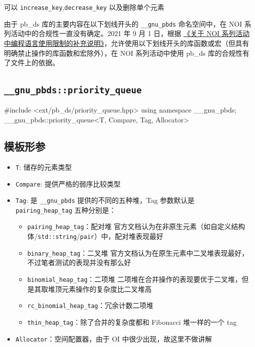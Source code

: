 可以 \texttt{increase\_key},\texttt{decrease\_key} 以及删除单个元素

由于 pb\_ds 库的主要内容在以下划线开头的 \texttt{\_\_gnu\_pbds} 命名空间中，在 NOI 系列活动中的合规性一直没有确定。2021 年 9 月 1 日，根据 \href{https://www.noi.cn/xw/2021-09-01/735729.shtml}{《关于 NOI 系列活动中编程语言使用限制的补充说明》}，允许使用以下划线开头的库函数或宏（但具有明确禁止操作的库函数和宏除外），在 NOI 系列活动中使用 pb\_ds 库的合规性有了文件上的依据。

\subsection{\texorpdfstring{\texttt{\_\_gnu\_pbds::priority\_queue}}{\_\_gnu\_pbds::priority\_queue}}\label{gnu_pbdspriority_queue}


\begin{codeline}
#include <ext/pb_ds/priority_queue.hpp>
using namespace __gnu_pbds;
__gnu_pbds::priority_queue<T, Compare, Tag, Allocator>
\end{codeline}


\subsection{模板形参}\label{ux6a21ux677fux5f62ux53c2}

\begin{itemize}
\tightlist
\item
  \texttt{T}: 储存的元素类型
\item
  \texttt{Compare}: 提供严格的弱序比较类型
\item
  \texttt{Tag}: 是 \texttt{\_\_gnu\_pbds} 提供的不同的五种堆，Tag 参数默认是 \texttt{pairing\_heap\_tag} 五种分别是：

  \begin{itemize}
  \tightlist
  \item
    \texttt{pairing\_heap\_tag}：配对堆 官方文档认为在非原生元素（如自定义结构体/\texttt{std::string}/\texttt{pair}）中，配对堆表现最好
  \item
    \texttt{binary\_heap\_tag}：二叉堆 官方文档认为在原生元素中二叉堆表现最好，不过笔者测试的表现并没有那么好
  \item
    \texttt{binomial\_heap\_tag}：二项堆 二项堆在合并操作的表现要优于二叉堆，但是其取堆顶元素操作的复杂度比二叉堆高
  \item
    \texttt{rc\_binomial\_heap\_tag}：冗余计数二项堆
  \item
    \texttt{thin\_heap\_tag}：除了合并的复杂度都和 Fibonacci 堆一样的一个 tag
  \end{itemize}
\item
  \texttt{Allocator}：空间配置器，由于 OI 中很少出现，故这里不做讲解
\end{itemize}

